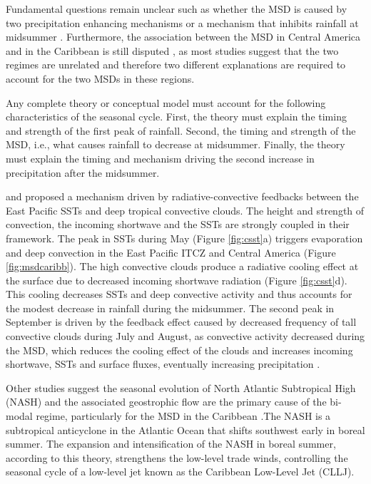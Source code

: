 Fundamental questions remain unclear such  as whether the MSD is caused by two precipitation enhancing mechanisms \citep{karnauskas2013} or a mechanism that inhibits rainfall at midsummer \citep{duranquesada2017}. 
Furthermore, the association between the MSD in Central America and in the Caribbean is still disputed \citep{gamble2008}, as most studies suggest that the two regimes are unrelated and therefore two different explanations are required to account for the two MSDs in these regions. 

Any complete theory or conceptual model must account for the following characteristics of the seasonal cycle. First, the theory must explain the timing and strength of the first peak of rainfall. Second, the timing and strength of the MSD, i.e., what causes rainfall to decrease at midsummer. Finally, the theory must explain the timing and mechanism driving the second increase in precipitation after the midsummer. %

\cite{magana1999} and \cite{magana2005} proposed a mechanism driven by radiative-convective feedbacks between the East Pacific SSTs and deep tropical convective clouds. The height and strength of convection, the incoming shortwave and the SSTs are strongly coupled in their framework. %
The peak in  SSTs during May (Figure \ref{fig:csst}a) triggers evaporation and deep convection in the East Pacific ITCZ and Central America (Figure \ref{fig:msdcaribb}).
The high convective clouds produce a radiative cooling effect at the surface due to decreased incoming shortwave radiation (Figure \ref{fig:csst}d).
This cooling  decreases SSTs and deep convective activity and thus accounts for the modest decrease in rainfall during the midsummer.
The second peak in September is driven by the feedback effect caused by decreased frequency of tall convective clouds during July and August, as convective activity decreased during the MSD, which reduces the cooling effect of the clouds and increases incoming shortwave, SSTs and surface fluxes, eventually increasing precipitation \citep{magana1999}.



 Other studies suggest the seasonal evolution of North Atlantic Subtropical High (NASH) and the associated geostrophic flow are the primary cause of the bi-modal regime, particularly for the MSD in the Caribbean  \citep[e.g.][]{mapes2005,gamble2008,curtis2008}.The NASH is a subtropical anticyclone in the Atlantic Ocean that shifts southwest early in boreal summer. The expansion and intensification of the NASH in boreal summer, according to this theory, strengthens the low-level trade winds, controlling the seasonal cycle of a low-level jet known as the Caribbean Low-Level Jet (CLLJ). 
 
